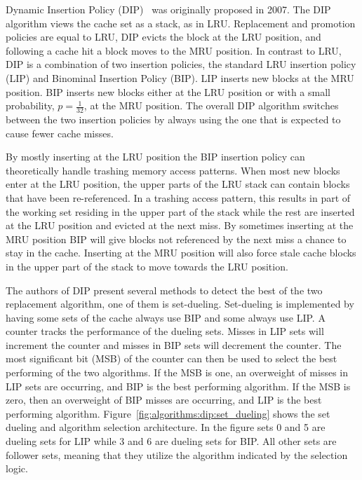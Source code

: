 Dynamic Insertion Policy (DIP)~\cite{Qureshi2007} was originally proposed in 2007.
The DIP algorithm views the cache set as a stack, as in LRU.
Replacement and promotion policies are equal to LRU, DIP evicts the block at the LRU position, and following a cache hit a block moves to the MRU position.
In contrast to LRU, DIP is a combination of two insertion policies, the standard LRU insertion policy (LIP) and Binominal Insertion Policy (BIP).
LIP inserts new blocks at the MRU position.
BIP inserts new blocks either at the LRU position or with a small probability, $p = \frac{1}{32}$, at the MRU position. 
The overall DIP algorithm switches between the two insertion policies by always using the one that is expected to cause fewer cache misses.

By mostly inserting at the LRU position the BIP insertion policy can theoretically handle trashing memory access patterns.
When most new blocks enter at the LRU position, the upper parts of the LRU stack can contain blocks that have been re-referenced.
In a trashing access pattern, this results in part of the working set residing in the upper part of the stack while the rest are inserted at the LRU position and evicted at the next miss.
By sometimes inserting at the MRU position BIP will give blocks not referenced by the next miss a chance to stay in the cache. 
Inserting at the MRU position will also force stale cache blocks in the upper part of the stack to move towards the LRU position.

The authors of DIP present several methods to detect the best of the two replacement algorithm, one of them is set-dueling.
Set-dueling is implemented by having some sets of the cache always use BIP and some always use LIP.
A counter tracks the performance of the dueling sets.
Misses in LIP sets will increment the counter and misses in BIP sets will decrement the counter.
The most significant bit (MSB) of the counter can then be used to select the best performing of the two algorithms.
If the MSB is one, an overweight of misses in LIP sets are occurring, and BIP is the best performing algorithm. 
If the MSB is zero, then an overweight of BIP misses are occurring, and LIP is the best performing algorithm.
Figure~\ref{fig:algorithms:dip:set_dueling} shows the set dueling and algorithm selection architecture.
In the figure sets 0 and 5 are dueling sets for LIP while 3 and 6 are dueling sets for BIP.
All other sets are follower sets, meaning that they utilize the algorithm indicated by the selection logic.

